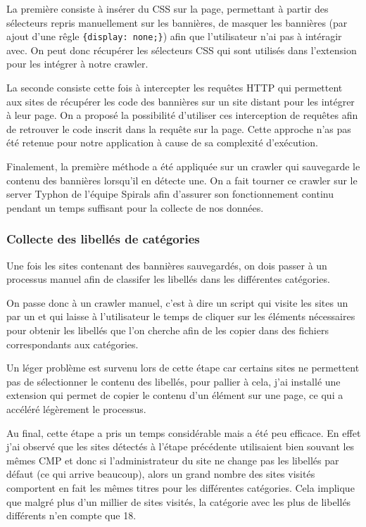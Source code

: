 \documentclass[oneside,a4paper,12pt]{article}
\begin{document}
	La première consiste à insérer du CSS sur la page, permettant à partir des sélecteurs repris manuellement sur les bannières, de masquer les bannières (par ajout d'une rêgle \lstinline|{display: none;}|) afin que l'utilisateur n'ai pas à intéragir avec.
	On peut donc récupérer les sélecteurs CSS qui sont utilisés dans l'extension pour les intégrer à notre crawler.
	
	La seconde consiste cette fois à intercepter les requêtes HTTP qui permettent aux sites de récupérer les code des bannières sur un site distant pour les intégrer à leur page.
	On a proposé la possibilité d'utiliser ces interception de requêtes afin de retrouver le code inscrit dans la requête sur la page. Cette approche n'as pas été retenue pour notre application à cause de sa complexité d'exécution.
	
	Finalement, la première méthode a été appliquée sur un crawler qui sauvegarde le contenu des bannières lorsqu'il en détecte une. On a fait tourner ce crawler sur le server Typhon de l'équipe Spirals afin d'assurer son fonctionnement continu pendant un temps suffisant pour la collecte de nos données.
	 
	\subsubsection{Collecte des libellés de catégories}
	Une fois les sites contenant des bannières sauvegardés, on dois passer à un processus manuel afin de classifer les libellés dans les différentes catégories.
	
	On passe donc à un crawler manuel, c'est à dire un script qui visite les sites un par un et qui laisse à l'utilisateur le temps de cliquer sur les éléments nécessaires pour obtenir les libellés que l'on cherche afin de les copier dans des fichiers correspondants aux catégories.
	
	Un léger problème est survenu lors de cette étape car certains sites ne permettent pas de sélectionner le contenu des libellés, pour pallier à cela, j'ai installé une extension qui permet de copier le contenu d'un élément sur une page, ce qui a accéléré légèrement le processus.
	
	Au final, cette étape a pris un temps considérable mais a été peu efficace. En effet j'ai observé que les sites détectés à l'étape précédente utilisaient bien souvant les mêmes CMP et donc si l'administrateur du site ne change pas les libellés par défaut (ce qui arrive beaucoup), alors un grand nombre des sites visités comportent en fait les mêmes titres pour les différentes catégories.
	Cela implique que malgré plus d'un millier de sites visités, la catégorie avec les plus de libellés différents n'en compte que 18.
	
\end{document}
